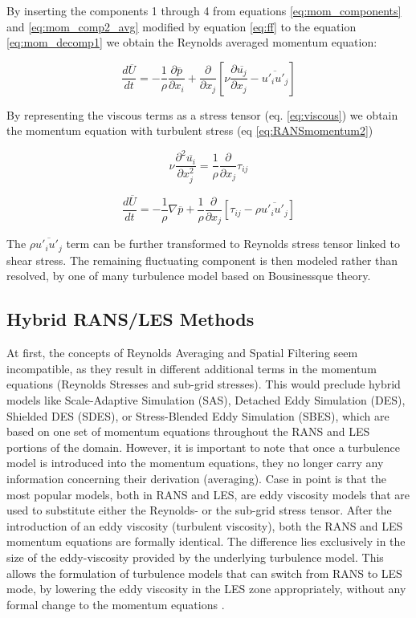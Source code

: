 By inserting the components 1 through 4 from equations \ref{eq:mom_components} and \ref{eq:mom_comp2_avg} modified by equation \ref{eq:ff} to the equation \ref{eq:mom_decomp1} we obtain the Reynolds averaged momentum equation:

\begin{equation} \label{eq:RANSmomentum}
\frac{d \overline{U}}{dt}
=
- \frac{1}{\rho} \frac{\partial \overline{p}}{\partial x_i}
+ \frac{\partial}{\partial x_j} \left[ \nu \frac{\partial \overline{u_j}}{\partial x_j} - \overline{u'_i u'_j}\right]
\end{equation}

By representing the viscous terms as a stress tensor (eq. \ref{eq:viscous}) we obtain the momentum equation with turbulent stress (eq \ref{eq:RANSmomentum2})

\begin{equation} \label{eq:viscous}
\nu \frac{\partial^2 \overline{u_i}}{\partial x_j^2}
=
\frac{1}{\rho} \frac{\partial}{\partial x_j} \tau_{ij}
\end{equation}

\begin{equation} \label{eq:RANSmomentum2}
\frac{d \overline{U}}{dt}
=
- \frac{1}{\rho} \nabla \overline{p}
+ \frac{1}{\rho} \frac{\partial}{\partial x_j} \left[ \tau_{ij} - \rho \overline{u'_i u'_j} \right]
\end{equation}

The $\rho \overline{u'_i u'_j}$ term can be further transformed to Reynolds stress tensor linked to shear stress. The remaining fluctuating component is then modeled rather than resolved, by one of many turbulence model based on Bousinessque theory.

\subsection{Hybrid RANS/LES Methods}
At first, the concepts of Reynolds Averaging and Spatial Filtering seem incompatible, as they result in different additional terms in the momentum equations (Reynolds Stresses and sub-grid stresses). This would preclude hybrid models like Scale-Adaptive Simulation (SAS), Detached Eddy Simulation (DES), Shielded DES (SDES), or Stress-Blended Eddy Simulation (SBES), which are based on one set of momentum equations throughout the RANS and LES portions of the domain. However, it is important to note that once a turbulence model is introduced into the momentum equations, they no longer carry any information concerning their derivation (averaging). Case in point is that the most popular models, both in RANS and LES, are eddy viscosity models that are used to substitute either the Reynolds- or the sub-grid stress tensor. After the introduction of an eddy viscosity (turbulent viscosity), both the RANS and LES momentum equations are formally identical. The difference lies exclusively in the size of the eddy-viscosity provided by the underlying turbulence model. This allows the formulation of turbulence models that can switch from RANS to LES mode, by lowering the eddy viscosity in the LES zone appropriately, without any formal change to the momentum equations \citep{fluenttheory}.

